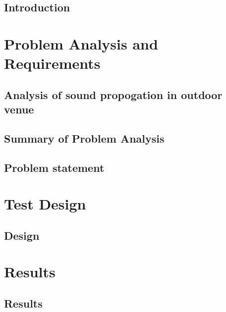 \glsresetall
 \graphicspath{{figures/analysing/}}
\chapter{Introduction}\label{ch:intro}



\part{Problem Analysis and Requirements}\label{pt:analysis} \glsresetall
\graphicspath{{figures/analysis/}}
\chapter{Analysis of sound propogation in outdoor venue}\label{ch:analysis}
%




\chapter{Summary of Problem Analysis}\label{ch:analysis:summary}



\chapter{Problem statement}\label{ch:statement}




\part{Test Design}\label{pt:design} 
\graphicspath{{figures/design/}}	
\chapter{Design}\label{ch:design}
%




\part{Results}\label{pt:test}
\chapter{Results}
\graphicspath{{figures/tests/}}
%

